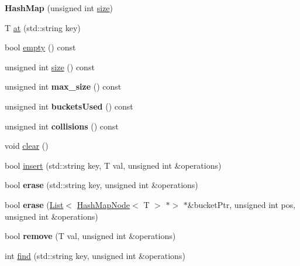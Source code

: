 \begin{DoxyCompactItemize}
\item 
\mbox{\label{class_hash_map_a88445c3b07d2b002ad2ca6521a67c6dc}} 
{\bfseries Hash\+Map} (unsigned int \hyperlink{class_hash_map_a1966ffac76bb402b771945c11b8b719a}{size})
\item 
T \hyperlink{class_hash_map_a385f0d379383ddbc05d72662b16568ed}{at} (std\+::string key)
\item 
bool \hyperlink{class_hash_map_a6dfff726611e1ae80744fc54947b424b}{empty} () const
\item 
unsigned int \hyperlink{class_hash_map_a1966ffac76bb402b771945c11b8b719a}{size} () const
\item 
\mbox{\label{class_hash_map_a4408d007817b15edd78f0cdd55e04bfa}} 
unsigned int {\bfseries max\+\_\+size} () const
\item 
\mbox{\label{class_hash_map_a454929948469a9de3ab58df7656c996f}} 
unsigned int {\bfseries buckets\+Used} () const
\item 
\mbox{\label{class_hash_map_a1d571fdd25035bbeb6e2dbd7820980d1}} 
unsigned int {\bfseries collisions} () const
\item 
void \hyperlink{class_hash_map_a7b78aa9f52a7524edc644920dc90fa94}{clear} ()
\item 
bool \hyperlink{class_hash_map_a65e981d68fae1496f1309b0a3c0a1df5}{insert} (std\+::string key, T val, unsigned int \&operations)
\item 
\mbox{\label{class_hash_map_a35162f16165312ac9ca02edf9c994277}} 
bool {\bfseries erase} (std\+::string key, unsigned int \&operations)
\item 
\mbox{\label{class_hash_map_a2ce710c46fe0fac02c0fd5a30e8c9ecb}} 
bool {\bfseries erase} (\hyperlink{class_list}{List}$<$ \hyperlink{class_hash_map_node}{Hash\+Map\+Node}$<$ T $>$ $\ast$$>$ $\ast$\&bucket\+Ptr, unsigned int pos, unsigned int \&operations)
\item 
\mbox{\label{class_hash_map_ab18355694390c10781ac1097876364de}} 
bool {\bfseries remove} (T val, unsigned int \&operations)
\item 
int \hyperlink{class_hash_map_a31b525e08123f23108b7ad83e24f0b75}{find} (std\+::string key, unsigned int \&operations)
$$
\end{DoxyCompactItemize}
